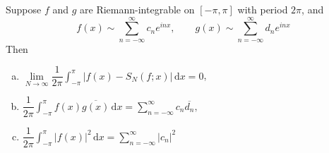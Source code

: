   \begin{theorem}
    Suppose  $ f  $ and  $ g  $ are Riemann-integrable on  $ [-\pi,\pi] $ with period  $ 2\pi  $, and 
    \[f(x)\sim \sum\limits_{n=-\infty}^{\infty}c_ne^{inx},\qquad g(x)\sim \sum\limits_{n=-\infty }^{\infty} d_ne^{inx} \]
    Then 
    \begin{enumerate}[a)]
        \item  $ \lim\limits_{N\to\infty} \dfrac{1}{2\pi }\int_{-\pi }^{\pi } |f(x)-S_N(f;x)|\, \mathrm{d}x=0    $,
        \item  $ \dfrac{1 }{2\pi }\int_{-\pi }^{\pi } f(x)\overline{g(x)}\, \mathrm{d}x=\sum\limits_{n=-\infty}^{\infty} c_n\overline{d_n}   , $ 
        \item  $ \dfrac{1 }{2\pi }\int_{-\pi }^{\pi } |f(x)|^2\, \mathrm{d}x =\sum\limits_{n=-\infty}^{\infty } |c_n|^2  $ 
    \end{enumerate}
\end{theorem}
